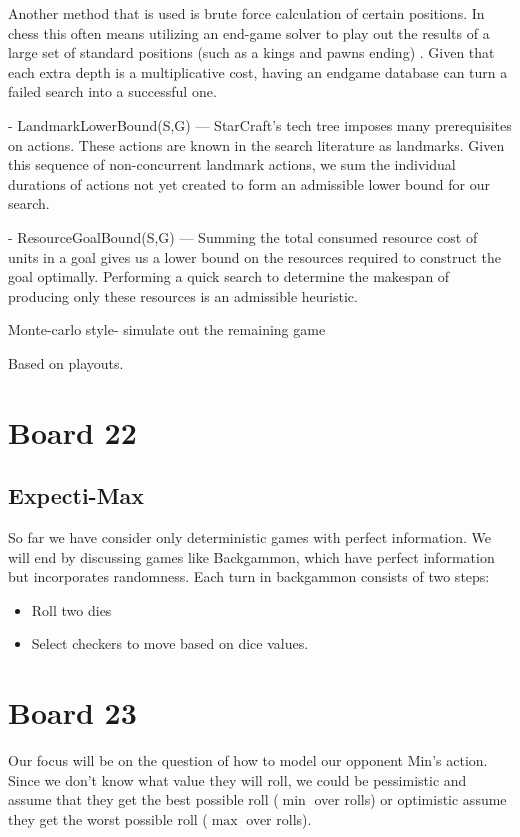 \documentclass[11pt]{article}
\begin{document}
Another method that is used is brute force calculation of certain positions. In chess this often means utilizing an end-game solver to play out the results of a large set of standard positions (such as a kings and pawns ending) . Given that each extra depth is a multiplicative cost, having an endgame database can turn a failed search into a successful one.


- LandmarkLowerBound(S,G) — StarCraft’s tech tree
imposes many prerequisites on actions. These actions are
known in the search literature as landmarks. Given this sequence
of non-concurrent landmark actions, we sum the individual
durations of actions not yet created to form an admissible
lower bound for our search.

- ResourceGoalBound(S,G) — Summing the total consumed
resource cost of units in a goal gives us a lower bound
on the resources required to construct the goal optimally.
Performing a quick search to determine the makespan of
producing only these resources is an admissible heuristic.


Monte-carlo style- simulate out the remaining game

Based on playouts. 

\section{Board 22}

\subsection{Expecti-Max}


So far we have consider only deterministic games with perfect information. We will end by discussing games like Backgammon, which have perfect information but incorporates randomness. Each turn in backgammon consists of two steps:

\begin{itemize}
\item Roll two dies
\item Select checkers to move based on dice values. 
\end{itemize}


\section{Board 23}
Our focus will be on the question of how to model our opponent Min's action. Since we don't know what value they will roll, we could be pessimistic and assume that they get the best possible roll ($\min$ over rolls) or optimistic assume they get the worst possible roll ($\max$ over rolls). 
\end{document}
